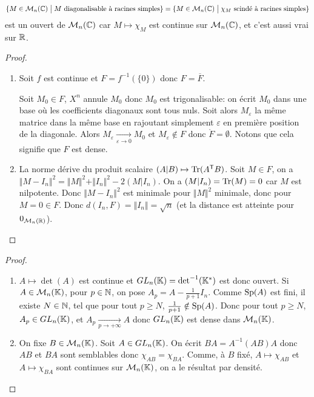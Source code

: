 \begin{remark}
	\begin{equation}\{M\in\mathcal{M}_{n}(\mathbb{C})\bigm|M\text{ diagonalisable à racines simples}\}=\{M\in\mathcal{M}_{n}(\mathbb{C})\bigm|\chi_M\text{ scindé à racines simples}\}\end{equation}
	est un ouvert de $\mathcal{M}_{n}(\mathbb{C})$ car $M\mapsto\chi_{M}$ est continue sur $\mathcal{M}_{n}(\mathbb{C})$, et c'est aussi vrai sur $\mathbb{R}$.
\end{remark}

\begin{proof}
	\phantom{}
	\begin{enumerate}
		\item Soit 
		$f$ est continue et $F=f^{-1}(\{0\})$ donc $F=\overline{F}$.

		Soit $M_{0}\in F$, $X^{n}$ annule $M_{0}$ donc $M_{0}$ est trigonalisable: on écrit $M_{0}$ dans une base où les coefficients diagonaux sont tous nuls. Soit alors $M_{\varepsilon}$ la même matrice dans la même base en rajoutant simplement $\varepsilon$ en première position de la diagonale. Alors $M_{\varepsilon}\xrightarrow[\varepsilon\to0]{}M_{0}$ et $M_{\varepsilon}\notin F$ donc $\mathring{F}=\emptyset$. Notons que cela signifie que $F$ est dense.

		\item La norme dérive du produit scalaire $(A|B)\mapsto\operatorname{Tr}(A^{\mathsf{T}}B)$. Soit $M\in F$, on a $\Vert M-I_{n}\Vert^{2}=\Vert M\Vert^{2}+\Vert I_{n}\Vert^{2}-2(M|I_{n})$. On a $(M|I_{n})=\operatorname{Tr}(M)=0$ car $M$ est nilpotente. Donc $\Vert M-I_{n}\Vert^{2}$ est minimale pour $\Vert M\Vert^{2}$ minimale, donc pour $M=0\in F$. Donc $d(I_{n},F)=\Vert I_{n}\Vert=\sqrt{n}$ (et la distance est atteinte pour $0_{\mathcal{M}_n(\mathbb{R})}$).
	\end{enumerate}
\end{proof}

\begin{proof}
	\phantom{}
	\begin{enumerate}
		\item $A\mapsto\det(A)$ est continue et $GL_{n}(\mathbb{K})=\det^{-1}(\mathbb{K}^{*})$ est donc ouvert. Si $A\in\mathcal{M}_{n}(\mathbb{K})$, pour $p\in\mathbb{N}$, on pose $A_{p}=A-\frac{1}{p+1}I_{n}$. Comme $\operatorname{Sp}(A)$ est fini, il existe $N\in\mathbb{N}$, tel que pour tout $p\geqslant N$, $\frac{1}{p+1}\notin\operatorname{Sp}(A)$. Donc pour tout $p\geqslant N$, $A_{p}\in GL_{n}(\mathbb{K})$, et $A_{p}\xrightarrow[p\to+\infty]{}A$ donc $GL_{n}(\mathbb{K})$ est dense dans $\mathcal{M}_{n}(\mathbb{K})$.
		\item On fixe $B\in\mathcal{M}_{n}(\mathbb{K})$. Soit $A\in GL_{n}(\mathbb{K})$. On écrit $BA=A^{-1}(AB)A$ donc $AB$ et $BA$ sont semblables donc $\chi_{AB}=\chi_{BA}$. Comme, à $B$ fixé, $A\mapsto\chi_{AB}$ et $A\mapsto\chi_{BA}$ sont continues sur $\mathcal{M}_{n}(\mathbb{K})$, on a le résultat par densité.
	\end{enumerate}
\end{proof}

